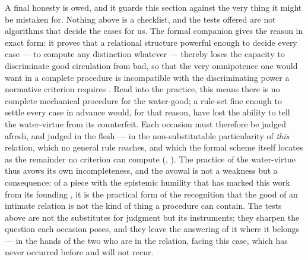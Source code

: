 A final honesty is owed, and it guards this section against the very thing it might be mistaken for. Nothing above is a checklist, and the tests offered are not algorithms that decide the cases for us. The formal companion gives the reason in exact form: it proves that a relational structure powerful enough to decide every case --- to compute any distinction whatever --- thereby loses the capacity to discriminate good circulation from bad, so that the very omnipotence one would want in a complete procedure is incompatible with the discriminating power a normative criterion requires \parencite{wan2026braid}. Read into the practice, this means there is no complete mechanical procedure for the water-good; a rule-set fine enough to settle every case in advance would, for that reason, have lost the ability to tell the water-virtue from its counterfeit. Each occasion must therefore be judged afresh, and judged in the flesh --- in the non-substitutable particularity of \emph{this} relation, which no general rule reaches, and which the formal scheme itself locates as the remainder no criterion can compute (, ). The practice of the water-virtue thus avows its own incompleteness, and the avowal is not a weakness but a consequence: of a piece with the epistemic humility that has marked this work from its founding \parencite{wan2024grb}, it is the practical form of the recognition that the good of an intimate relation is not the kind of thing a procedure can contain. The tests above are not the substitutes for judgment but its instruments; they sharpen the question each occasion poses, and they leave the answering of it where it belongs --- in the hands of the two who are in the relation, facing this case, which has never occurred before and will not recur.
